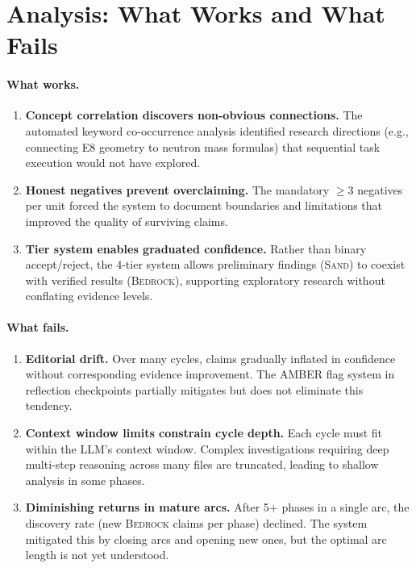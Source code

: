 \documentclass[11pt,a4paper]{article}
\newcommand{\bedrock}{\textsc{Bedrock}}
\newcommand{\sand}{\textsc{Sand}}
\begin{document}
\section{Analysis: What Works and What Fails}
\label{sec:analysis}

\paragraph{What works.}
\begin{enumerate}[nosep]
    \item \textbf{Concept correlation discovers non-obvious connections.} The
          automated keyword co-occurrence analysis identified research directions
          (e.g., connecting E8 geometry to neutron mass formulas) that sequential
          task execution would not have explored.
    \item \textbf{Honest negatives prevent overclaiming.} The mandatory $\geq$3
          negatives per unit forced the system to document boundaries and limitations
          that improved the quality of surviving claims.
    \item \textbf{Tier system enables graduated confidence.} Rather than binary
          accept/reject, the 4-tier system allows preliminary findings (\sand{})
          to coexist with verified results (\bedrock{}), supporting exploratory
          research without conflating evidence levels.
\end{enumerate}

\paragraph{What fails.}
\begin{enumerate}[nosep]
    \item \textbf{Editorial drift.} Over many cycles, claims gradually inflated
          in confidence without corresponding evidence improvement. The AMBER flag
          system in reflection checkpoints partially mitigates but does not eliminate
          this tendency.
    \item \textbf{Context window limits constrain cycle depth.} Each cycle must
          fit within the LLM's context window. Complex investigations requiring
          deep multi-step reasoning across many files are truncated, leading to
          shallow analysis in some phases.
    \item \textbf{Diminishing returns in mature arcs.} After 5+ phases in a single
          arc, the discovery rate (new \bedrock{} claims per phase) declined.
          The system mitigated this by closing arcs and opening new ones, but
          the optimal arc length is not yet understood.
\end{enumerate}
\end{document}
